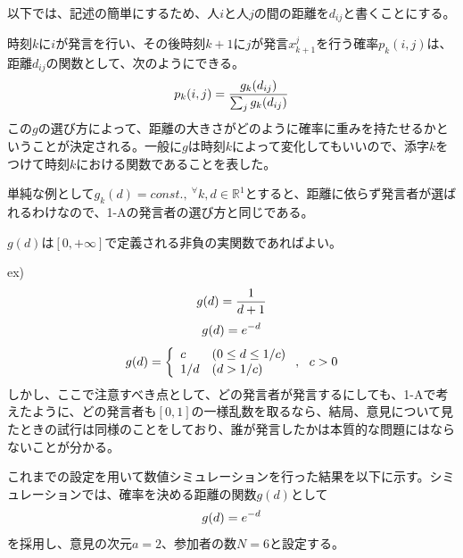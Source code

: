 \documentclass[letterpaper,10pt,english]{sphinxmanual}
\begin{document}
以下では、記述の簡単にするため、人\(i\)と人\(j\)の間の距離を\(d_{ij}\)と書くことにする。

時刻\(k\)に\(i\)が発言を行い、その後時刻\(k+1\)に\(j\)が発言\(x_{k+1}^{j}\)を行う確率\(p_{k}(i,j)\)は、距離\(d_{ij}\)の関数として、次のようにできる。
\begin{gather}
\begin{split}p_{k}(i,j) = \frac{g_{k}(d_{ij})}{\sum_{j} g_{k}(d_{ij})}\end{split}\notag
\end{gather}
この\(g\)の選び方によって、距離の大きさがどのように確率に重みを持たせるかということが決定される。一般に\(g\)は時刻\(k\)によって変化してもいいので、添字\(k\)をつけて時刻\(k\)における関数であることを表した。

単純な例として\(g_{k}(d) = const.,\ ^{\forall}k, d\in \mathbb{R}^{1}\)とすると、距離に依らず発言者が選ばれるわけなので、1-Aの発言者の選び方と同じである。

\(g(d)\)は\([0, +\infty]\)で定義される非負の実関数であればよい。

ex)
\begin{gather}
\begin{split}g(d) = \frac{1}{d+1}\end{split}\notag
\end{gather}\begin{gather}
\begin{split}g(d) = e^{-d}\end{split}\notag
\end{gather}\begin{gather}
\begin{split}g(d) = \left\{ \begin{array}{ll} c & (0\le d \le 1/c) \\
1/d & (d>1/c) \\
\end{array}\right., \ \ c>0\end{split}\notag
\end{gather}
しかし、ここで注意すべき点として、どの発言者が発言するにしても、1-Aで考えたように、どの発言者も\([0,1]\)の一様乱数を取るなら、結局、意見について見たときの試行は同様のことをしており、誰が発言したかは本質的な問題にはならないことが分かる。

これまでの設定を用いて数値シミュレーションを行った結果を以下に示す。シミュレーションでは、確率を決める距離の関数\(g(d)\)として
\begin{gather}
\begin{split}g(d) = e^{-d}\end{split}\notag
\end{gather}
を採用し、意見の次元\(a=2\)、参加者の数\(N=6\)と設定する。
\end{document}
